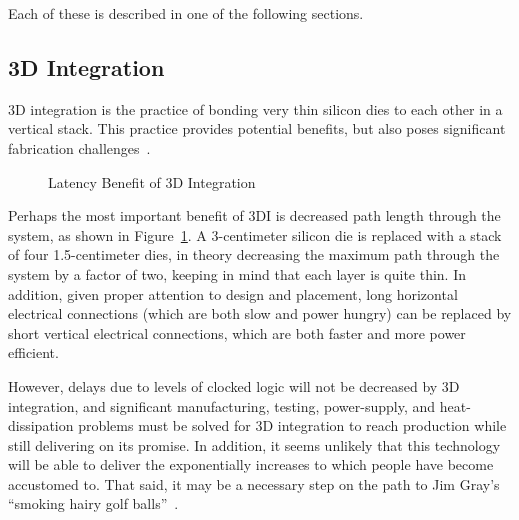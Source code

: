 Each of these is described in one of the following sections.

\subsection{3D Integration}
\label{sec:cpu:3D Integration}

3D integration is the practice of bonding very thin silicon dies to
each other in a vertical stack.
This practice provides potential benefits, but also poses
significant fabrication challenges~\cite{JohnKnickerbocker2008_3DI}.

\begin{figure}[tb]
\begin{center}
\end{center}
\caption{Latency Benefit of 3D Integration}
\label{fig:cpu:Latency Benefit of 3D Integration}
\end{figure}

Perhaps the most important benefit of 3DI is decreased path length through
the system, as shown in
Figure~\ref{fig:cpu:Latency Benefit of 3D Integration}.
A 3-centimeter silicon die is replaced with a stack of four 1.5-centimeter
dies, in theory decreasing the maximum path through the system by a factor
of two, keeping in mind that each layer is quite thin.
In addition, given proper attention to design and placement,
long horizontal electrical connections (which are both slow and
power hungry) can be replaced by short vertical electrical connections,
which are both faster and more power efficient.

However, delays due to levels of clocked logic will not be decreased
by 3D integration, and significant manufacturing, testing, power-supply,
and heat-dissipation problems must be solved for 3D integration to
reach production while still delivering on its promise.
In addition, it seems unlikely that this technology will be able to
deliver the exponentially increases to which people have become accustomed to.
That said, it may be a necessary step on the path to Jim Gray's
``smoking hairy golf balls''~\cite{JimGray2002SmokingHairyGolfBalls}.


